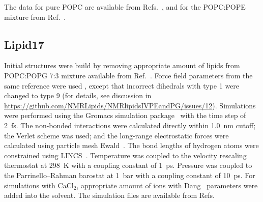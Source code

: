 \documentclass[journal=jpcbfk]{achemso}
\begin{document}
The data for pure POPC are available from Refs.~, and for the POPC:POPE mixture from Ref.~.



\subsection{Lipid17}

 

 

Initial structures were build by removing appropriate amount of lipids from POPC:POPG 7:3 mixture available from Ref.~.
Force field parameters from the same reference were used ,
except that incorrect dihedrals with type 1 were changed to type 9
(for details, see discussion in \url{https://github.com/NMRLipids/NMRlipidsIVPEandPG/issues/12}).
Simulations were performed using the Gromacs simulation package~\cite{pall20} with the time step of 2~fs. 
The non-bonded interactions were calculated directly within 1.0~nm cutoff; the Verlet scheme was used\cite{Pall13};
and the long-range electrostatic forces were calculated using particle mesh Ewald~\cite{essman95}. 
The bond lengths of hydrogen atoms were constrained using LINCS~\cite{hess97}.
Temperature was coupled to the velocity rescaling thermostat \cite{bussi07} at 298~K with a coupling constant of 1~ps.
Pressure was coupled to the Parrinello--Rahman barostat \cite{parrinello81} at 1~bar with a coupling constant of 10~ps. 
For simulations with CaCl$_2$, appropriate amount of ions with Dang~\cite{smith94,dang06} parameters were added into the solvent.
The simulation files are available from
Refs.~
\end{document}
